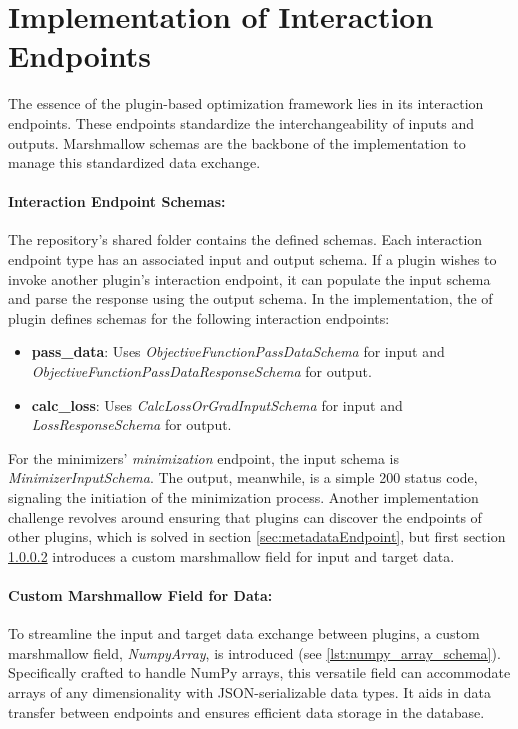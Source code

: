 \documentclass[
  a4paper,  %
  twoside,  %
  bibliography=totoc,
  headsepline,
  cleardoublepage=empty,
  parskip=half,
  draft=false
]{scrbook}
\begin{document}
\noindent\begin{minipage}{\linewidth}
  
\end{minipage}

\section{Implementation of Interaction Endpoints}
\label{sec:implementationOfInteractionEndpoints}

The essence of the plugin-based optimization framework lies in its interaction endpoints.
These endpoints standardize the interchangeability of inputs and outputs.
Marshmallow schemas are the backbone of the implementation to manage this standardized data exchange.

\paragraph{Interaction Endpoint Schemas:}
The repository's shared folder contains the defined schemas.
Each interaction endpoint type has an associated input and output schema.
If a plugin wishes to invoke another plugin's interaction endpoint, it can populate the input schema and parse the response using the output schema.
In the implementation, the \gls{of} plugin defines schemas for the following interaction endpoints:
\begin{itemize}
  \item \textbf{pass\_data}: Uses \emph{ObjectiveFunctionPassDataSchema} for input and \emph{ObjectiveFunctionPassDataResponseSchema} for output.
  \item \textbf{calc\_loss}: Uses \emph{CalcLossOrGradInputSchema} for input and \emph{LossResponseSchema} for output.
\end{itemize}
For the minimizers' \emph{minimization} endpoint, the input schema is \emph{MinimizerInputSchema}.
The output, meanwhile, is a simple 200 status code, signaling the initiation of the minimization process.
Another implementation challenge revolves around ensuring that plugins can discover the endpoints of other plugins, which is solved in section \ref{sec:metadataEndpoint}, but first section
\ref{sec:customMarshmallowFieldForData} introduces a custom marshmallow field for input and target data.

\paragraph{Custom Marshmallow Field for Data:}
\label{sec:customMarshmallowFieldForData}
To streamline the input and target data exchange between plugins, a custom marshmallow field, \emph{NumpyArray}, is introduced (see \ref{lst:numpy_array_schema}).
Specifically crafted to handle NumPy arrays, this versatile field can accommodate arrays of any dimensionality with JSON-serializable data types.
It aids in data transfer between endpoints and ensures efficient data storage in the database.
\end{document}
